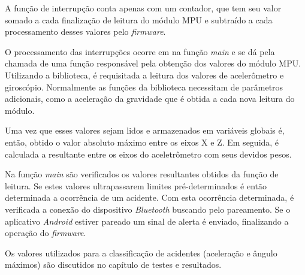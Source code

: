 A função de interrupção conta apenas com um contador, que tem seu valor somado a cada finalização de leitura do módulo MPU e subtraído a cada processamento desses valores pelo \textit{firmware}.

O processamento das interrupções ocorre em na função \textit{main} e se dá pela chamada de uma função responsável pela obtenção dos valores do módulo MPU. Utilizando a biblioteca, é requisitada a leitura dos valores de acelerômetro e giroscópio. Normalmente as funções da biblioteca necessitam de parâmetros adicionais, como a aceleração da gravidade que é obtida a cada nova leitura do módulo.

Uma vez que esses valores sejam lidos e armazenados em variáveis globais é, então, obtido o valor absoluto máximo entre os eixos X e Z. Em seguida, é calculada a resultante entre os eixos do aceletrômetro com seus devidos pesos.

Na função \textit{main} são verificados os valores resultantes obtidos da função de leitura. Se estes valores ultrapassarem limites pré-determinados é então determinada a ocorrência de um acidente.  Com esta ocorrência determinada, é verificada a conexão do dispositivo \textit{Bluetooth} buscando pelo pareamento. Se o aplicativo \textit{Android} estiver pareado um sinal de alerta é enviado, finalizando a operação do \textit{firmware}.

Os valores utilizados para a classificação de acidentes (aceleração e ângulo máximos) são discutidos no capítulo de testes e resultados.


